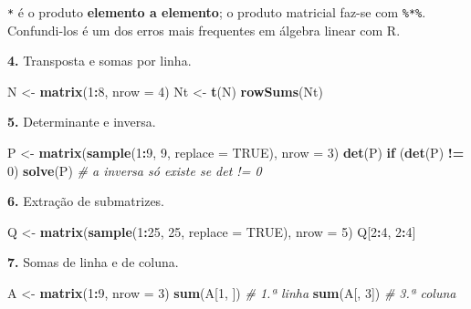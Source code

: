 \documentclass[
  portuguese,
  11pt,
  openany]{book}
\newenvironment{Shaded}{\begin{snugshade}}{\end{snugshade}}
\newcommand{\AttributeTok}[1]{\textcolor[rgb]{0.13,0.29,0.53}{#1}}
\newcommand{\CommentTok}[1]{\textcolor[rgb]{0.56,0.35,0.01}{\textit{#1}}}
\newcommand{\ConstantTok}[1]{\textcolor[rgb]{0.56,0.35,0.01}{#1}}
\newcommand{\ControlFlowTok}[1]{\textcolor[rgb]{0.13,0.29,0.53}{\textbf{#1}}}
\newcommand{\DecValTok}[1]{\textcolor[rgb]{0.00,0.00,0.81}{#1}}
\newcommand{\FunctionTok}[1]{\textcolor[rgb]{0.13,0.29,0.53}{\textbf{#1}}}
\newcommand{\NormalTok}[1]{#1}
\newcommand{\OtherTok}[1]{\textcolor[rgb]{0.56,0.35,0.01}{#1}}
\newcommand{\SpecialCharTok}[1]{\textcolor[rgb]{0.81,0.36,0.00}{\textbf{#1}}}
\begin{document}
\texttt{*} é o produto \textbf{elemento a elemento}; o produto matricial faz-se com \texttt{\%*\%}.
Confundi-los é um dos erros mais frequentes em álgebra linear com R.

\textbf{4.} Transposta e somas por linha.

\begin{Shaded}
\begin{Highlighting}[]
\NormalTok{N }\OtherTok{\textless{}{-}} \FunctionTok{matrix}\NormalTok{(}\DecValTok{1}\SpecialCharTok{:}\DecValTok{8}\NormalTok{, }\AttributeTok{nrow =} \DecValTok{4}\NormalTok{)}
\NormalTok{Nt }\OtherTok{\textless{}{-}} \FunctionTok{t}\NormalTok{(N)}
\FunctionTok{rowSums}\NormalTok{(Nt)}
\end{Highlighting}
\end{Shaded}

\textbf{5.} Determinante e inversa.

\begin{Shaded}
\begin{Highlighting}[]
\NormalTok{P }\OtherTok{\textless{}{-}} \FunctionTok{matrix}\NormalTok{(}\FunctionTok{sample}\NormalTok{(}\DecValTok{1}\SpecialCharTok{:}\DecValTok{9}\NormalTok{, }\DecValTok{9}\NormalTok{, }\AttributeTok{replace =} \ConstantTok{TRUE}\NormalTok{), }\AttributeTok{nrow =} \DecValTok{3}\NormalTok{)}
\FunctionTok{det}\NormalTok{(P)}
\ControlFlowTok{if}\NormalTok{ (}\FunctionTok{det}\NormalTok{(P) }\SpecialCharTok{!=} \DecValTok{0}\NormalTok{) }\FunctionTok{solve}\NormalTok{(P)   }\CommentTok{\# a inversa só existe se det != 0}
\end{Highlighting}
\end{Shaded}

\textbf{6.} Extração de submatrizes.

\begin{Shaded}
\begin{Highlighting}[]
\NormalTok{Q }\OtherTok{\textless{}{-}} \FunctionTok{matrix}\NormalTok{(}\FunctionTok{sample}\NormalTok{(}\DecValTok{1}\SpecialCharTok{:}\DecValTok{25}\NormalTok{, }\DecValTok{25}\NormalTok{, }\AttributeTok{replace =} \ConstantTok{TRUE}\NormalTok{), }\AttributeTok{nrow =} \DecValTok{5}\NormalTok{)}
\NormalTok{Q[}\DecValTok{2}\SpecialCharTok{:}\DecValTok{4}\NormalTok{, }\DecValTok{2}\SpecialCharTok{:}\DecValTok{4}\NormalTok{]}
\end{Highlighting}
\end{Shaded}

\textbf{7.} Somas de linha e de coluna.

\begin{Shaded}
\begin{Highlighting}[]
\NormalTok{A }\OtherTok{\textless{}{-}} \FunctionTok{matrix}\NormalTok{(}\DecValTok{1}\SpecialCharTok{:}\DecValTok{9}\NormalTok{, }\AttributeTok{nrow =} \DecValTok{3}\NormalTok{)}
\FunctionTok{sum}\NormalTok{(A[}\DecValTok{1}\NormalTok{, ])   }\CommentTok{\# 1.ª linha}
\FunctionTok{sum}\NormalTok{(A[, }\DecValTok{3}\NormalTok{])   }\CommentTok{\# 3.ª coluna}
\end{Highlighting}
\end{Shaded}
\end{document}
